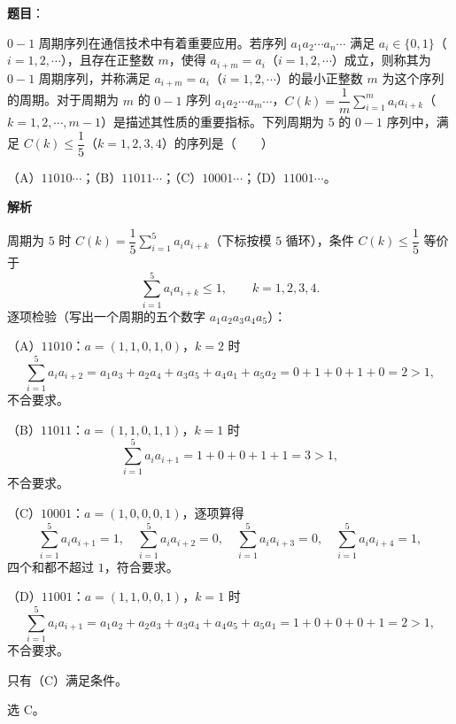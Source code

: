 \begin{answer}

\textbf{题目}：

$0-1$ 周期序列在通信技术中有着重要应用。若序列 $a_1a_2\cdots a_n\cdots$ 满足 $a_i\in\{0,1\}$（$i=1,2,\cdots$），且存在正整数 $m$，使得 $a_{i+m}=a_i$（$i=1,2,\cdots$）成立，则称其为 $0-1$ 周期序列，并称满足 $a_{i+m}=a_i$（$i=1,2,\cdots$）的最小正整数 $m$ 为这个序列的周期。对于周期为 $m$ 的 $0-1$ 序列 $a_1a_2\cdots a_m\cdots$，$C(k)=\dfrac1m\sum\limits_{i=1}^m a_ia_{i+k}$（$k=1,2,\cdots,m-1$）是描述其性质的重要指标。下列周期为 $5$ 的 $0-1$ 序列中，满足 $C(k)\leqslant\dfrac15$（$k=1,2,3,4$）的序列是\mbox{（　　）}

（A）$11010\cdots$；（B）$11011\cdots$；（C）$10001\cdots$；（D）$11001\cdots$。

\textbf{解析}

周期为 $5$ 时 $C(k)=\dfrac15\displaystyle\sum_{i=1}^{5}a_ia_{i+k}$（下标按模 $5$ 循环），条件 $C(k)\leqslant\dfrac15$ 等价于
\nopagebreak[4]
\[\sum_{i=1}^{5}a_ia_{i+k}\leqslant1,\qquad k=1,2,3,4 .\]
逐项检验（写出一个周期的五个数字 $a_1a_2a_3a_4a_5$）：

（A）$11010$：$a=(1,1,0,1,0)$，$k=2$ 时
\nopagebreak[4]
\[\sum_{i=1}^{5}a_ia_{i+2}=a_1a_3+a_2a_4+a_3a_5+a_4a_1+a_5a_2=0+1+0+1+0=2>1,\]
不合要求。

（B）$11011$：$a=(1,1,0,1,1)$，$k=1$ 时
\nopagebreak[4]
\[\sum_{i=1}^{5}a_ia_{i+1}=1+0+0+1+1=3>1,\]
不合要求。

（C）$10001$：$a=(1,0,0,0,1)$，逐项算得
\nopagebreak[4]
\[\sum_{i=1}^{5}a_ia_{i+1}=1,\quad \sum_{i=1}^{5}a_ia_{i+2}=0,\quad \sum_{i=1}^{5}a_ia_{i+3}=0,\quad \sum_{i=1}^{5}a_ia_{i+4}=1,\]
四个和都不超过 $1$，符合要求。

（D）$11001$：$a=(1,1,0,0,1)$，$k=1$ 时
\nopagebreak[4]
\[\sum_{i=1}^{5}a_ia_{i+1}=a_1a_2+a_2a_3+a_3a_4+a_4a_5+a_5a_1=1+0+0+0+1=2>1,\]
不合要求。

只有（C）满足条件。

选 C。


\end{answer}
